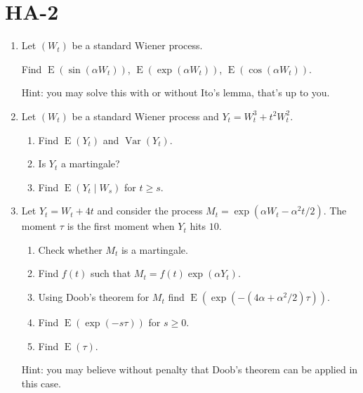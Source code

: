 \documentclass[12pt]{article}
\DeclareMathOperator{\Corr}{Corr}
\DeclareMathOperator{\Var}{Var}
\DeclareMathOperator{\E}{E}
\begin{document}
\newpage
\section{HA-2}

\begin{enumerate}


\item Let $(W_t)$ be a standard Wiener process.

Find $\E(\sin(\alpha W_t))$, $\E(\exp(\alpha W_t))$, $\E(\cos(\alpha W_t))$.

Hint: you may solve this with or without Ito's lemma, that's up to you. 

\item Let $(W_t)$ be a standard Wiener process and $Y_t = W_t^3 + t^2 W_t^2$.
\begin{enumerate}
  \item Find $\E(Y_t)$ and $\Var(Y_t)$.
  \item Is $Y_t$ a martingale?
  \item Find $\E(Y_{t} \mid W_s)$ for $t \geq s$. 
\end{enumerate}




\item Let $Y_t = W_t + 4t$ and consider the process $M_t = \exp(\alpha W_t - \alpha^2 t/2)$. 
The moment $\tau$ is the first moment when $Y_t$ hits $10$. 


\begin{enumerate}
  \item Check whether $M_t$ is a martingale. 
  \item Find $f(t)$ such that $M_t = f(t) \exp(\alpha Y_t)$.
  \item Using Doob's theorem for $M_t$ find $\E(\exp(-(4\alpha +\alpha^2/2) \tau))$.
  \item Find $\E(\exp(-s \tau))$ for $s \geq 0$. 
  \item Find $\E(\tau)$.
\end{enumerate}
Hint: you may believe without penalty that Doob's theorem can be applied in this case. 


\end{enumerate}
\end{document}
